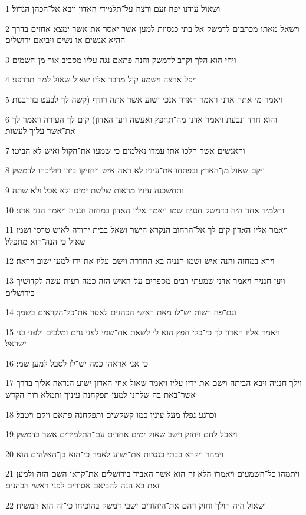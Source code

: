 \par 1 ושאול עודנו יפח זעם ורצח על־תלמידי האדון ויבא אל־הכהן הגדול׃
\par 2 וישאל מאתו מכתבים לדמשק אל־בתי כנסיות למען אשר יאסר את־אשר ימצא אחזים בדרך ההיא אנשים או נשים ויביאם ירושלים׃
\par 3 ויהי הוא הלך וקרב לדמשק והנה פתאם נגה עליו מסביב אור מן־השמים׃
\par 4 ויפל ארצה וישמע קול מדבר אליו שאול שאול למה תרדפני׃
\par 5 ויאמר מי אתה אדני ויאמר האדון אנכי ישוע אשר אתה רודף (קשה לך לבעט בדרבנות׃
\par 6 והוא חרד ונבעת ויאמר אדני מה־תחפץ ואעשה ויען האדון) קום לך העירה ויאמר לך את־אשר עליך לעשות׃
\par 7 והאנשים אשר הלכו אתו עמדו נאלמים כי שמעו את־הקול ואיש לא הביטו׃
\par 8 ויקם שאול מן־הארץ ובפתחו את־עיניו לא ראה איש ויחזיקו בידו ויוליכהו לדמשק׃
\par 9 ותחשכנה עיניו מראות שלשת ימים ולא אכל ולא שתה׃
\par 10 ותלמיד אחד היה בדמשק חנניה שמו ויאמר אליו האדון במחזה חנניה ויאמר הנני אדני׃
\par 11 ויאמר אליו האדון קום לך אל־הרחוב הנקרא הישר ושאל בבית יהודה לאיש טרסי ושמו שאול כי הנה־הוא מתפלל׃
\par 12 וירא במחזה והנה־איש ושמו חנניה בא החדרה וישם עליו את־ידו למען ישוב ויראה׃
\par 13 ויען חנניה ויאמר אדני שמעתי רבים מספרים על־האיש הזה כמה רעות עשה לקדושיך בירושלים׃
\par 14 וגם־פה רשות יש־לו מאת ראשי הכהנים לאסר את־כל־הקראים בשמך׃
\par 15 ויאמר אליו האדון לך כי־כלי חפץ הוא לי לשאת את־שמי לפני גוים ומלכים ולפני בני ישראל׃
\par 16 כי אני אראהו כמה יש־לו לסבל למען שמי׃
\par 17 וילך חנניה ויבא הביתה וישם את־ידיו עליו ויאמר שאול אחי האדון ישוע הנראה אליך בדרך אשר־באת בה שלחני למען תפקחנה עיניך ותמלא רוח הקדש׃
\par 18 וכרגע נפלו מעל עיניו כמו קשקשים ותפקחנה פתאם ויקם ויטבל׃
\par 19 ויאכל לחם ויחזק וישב שאול ימים אחדים עם־התלמידים אשר בדמשק׃
\par 20 וימהר ויקרא בבתי כנסיות את־ישוע לאמר כי־הוא בן־האלהים הוא׃
\par 21 ויתמהו כל־השמעים ויאמרו הלא זה הוא אשר האביד בירושלים את־קראי השם הזה ולמען זאת בא הנה להביאם אסורים לפני ראשי הכהנים׃
\par 22 ושאול היה הולך וחזק ויהם את־היהודים ישבי דמשק בהוכיחו כי־זה הוא המשיח׃
